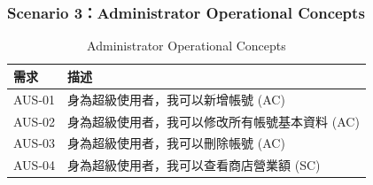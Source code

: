 \documentclass[a4paper, 12pt]{article}
\begin{document}
\subsubsection{Scenario 3：Administrator Operational Concepts}
\begin{table}[h]
    \centering
    \renewcommand{\arraystretch}{1.35}
    \begin{tabular}{|p{3cm}|p{10cm}|}
        \hline
        \textbf{需求} & \textbf{描述} \\
        \hline
        AUS-01 & 身為超級使用者，我可以新增帳號 (AC) \\
        \hline
        AUS-02 & 身為超級使用者，我可以修改所有帳號基本資料 (AC) \\
        \hline
        AUS-03 & 身為超級使用者，我可以刪除帳號 (AC) \\
        \hline
        AUS-04 & 身為超級使用者，我可以查看商店營業額 (SC) \\
        \hline
    \end{tabular}
    \caption{Administrator Operational Concepts}
    \label{tab:admin-user-stories-requirements}
\end{table}
\end{document}
